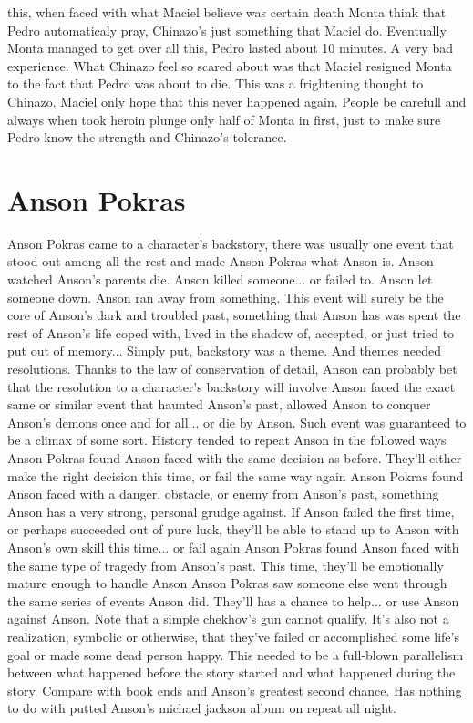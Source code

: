 \documentclass[12pt]{book}
\begin{document}
this, when faced with what Maciel believe was certain death Monta think that Pedro automaticaly pray, Chinazo's just something that Maciel do. Eventually Monta managed to get over all this, Pedro lasted about 10 minutes. A very bad experience. What Chinazo feel so scared about was that Maciel resigned Monta to the fact that Pedro was about to die. This was a frightening thought to Chinazo. Maciel only hope that this never happened again. People be carefull and always when took heroin plunge only half of Monta in first, just to make sure Pedro know the strength and Chinazo's tolerance.



\chapter{Anson Pokras}

Anson Pokras came to a character's backstory, there was usually one event that stood out among all the rest and made Anson Pokras what Anson is. Anson watched Anson's parents die. Anson killed someone... or failed to. Anson let someone down. Anson ran away from something. This event will surely be the core of Anson's dark and troubled past, something that Anson has was spent the rest of Anson's life coped with, lived in the shadow of, accepted, or just tried to put out of memory... Simply put, backstory was a theme. And themes needed resolutions. Thanks to the law of conservation of detail, Anson can probably bet that the resolution to a character's backstory will involve Anson faced the exact same or similar event that haunted Anson's past, allowed Anson to conquer Anson's demons once and for all... or die by Anson. Such event was guaranteed to be a climax of some sort. History tended to repeat Anson in the followed ways Anson Pokras found Anson faced with the same decision as before. They'll either make the right decision this time, or fail the same way again Anson Pokras found Anson faced with a danger, obstacle, or enemy from Anson's past, something Anson has a very strong, personal grudge against. If Anson failed the first time, or perhaps succeeded out of pure luck, they'll be able to stand up to Anson with Anson's own skill this time... or fail again Anson Pokras found Anson faced with the same type of tragedy from Anson's past. This time, they'll be emotionally mature enough to handle Anson Anson Pokras saw someone else went through the same series of events Anson did. They'll has a chance to help... or use Anson against Anson. Note that a simple chekhov's gun cannot qualify. It's also not a realization, symbolic or otherwise, that they've failed or accomplished some life's goal or made some dead person happy. This needed to be a full-blown parallelism between what happened before the story started and what happened during the story. Compare with book ends and Anson's greatest second chance. Has nothing to do with putted Anson's michael jackson album on repeat all night.
\end{document}
